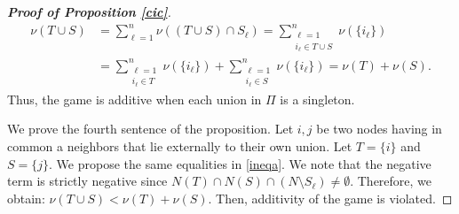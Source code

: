 \documentclass[preprint,11pt,authoryear]{elsarticle}
\theoremstyle{plain}
\begin{document}
\begin{proof}[\bf Proof of Proposition \ref{cic}]
	\[
	\begin{aligned}
		\nu(T \cup S) &= \sum_{\ell=1}^{n} \nu\left((T \cup S) \cap S_\ell\right) = \sum_{\substack{\ell=1 \\ i_\ell \in T \cup S}}^{n}
		\nu\left(\{i_\ell\}\right) \\[0.3em]
		&= \sum_{\substack{\ell=1 \\ i_\ell \in T}}^{n} \nu\left(\{i_\ell\}\right) +
		\sum_{\substack{\ell=1 \\ i_\ell \in S}}^{n} \nu\left(\{i_\ell\}\right) = \nu(T) + \nu(S).
	\end{aligned}
	\]
	Thus, the game is additive when each union in \( \Pi \) is a singleton.
	
	We prove the fourth sentence of the proposition.
	Let $i,j$ be two nodes having in common a neighbors that lie externally to their own union.
	Let $T=\{i\}$ and $S=\{j\}$. We propose the same equalities in \eqref{ineqa}.
	We note that  the negative term is strictly negative since
	$N(T) \cap N(S) \cap (N \setminus S_\ell)\neq \emptyset$.
	Therefore, we obtain: $\nu(T\cup S)< \nu(T)+\nu(S)$.
	Then, additivity of the game is violated.
	
\end{proof}
\end{document}
